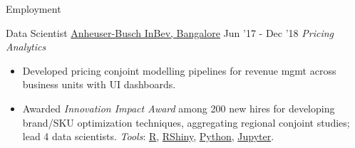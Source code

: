 \documentclass[]{mcdowellcv}
\begin{document}
\begin{cvsection}{Employment}
      \begin{cvsubsection}
        {Data Scientist}
        {\href{https://www.ab-inbev.com/}{Anheuser-Busch InBev, Bangalore}}
        {Jun '17 - Dec '18}
        \textit{Pricing Analytics}
          \begin{itemize}
              \item Developed pricing conjoint modelling pipelines for revenue mgmt across business units with UI dashboards.
              \item Awarded \textit{Innovation Impact Award} among 200 new hires for developing brand/SKU optimization techniques, aggregating regional conjoint studies; lead 4 data scientists. \textit{Tools}: \href{https://www.r-project.org/about.html}{R}, \href{https://shiny.rstudio.com/}{RShiny}, \href{https://www.python.org/}{Python}, \href{https://jupyter.org/}{Jupyter}.
          \end{itemize}
      \end{cvsubsection}
    \end{cvsection}
\end{document}
